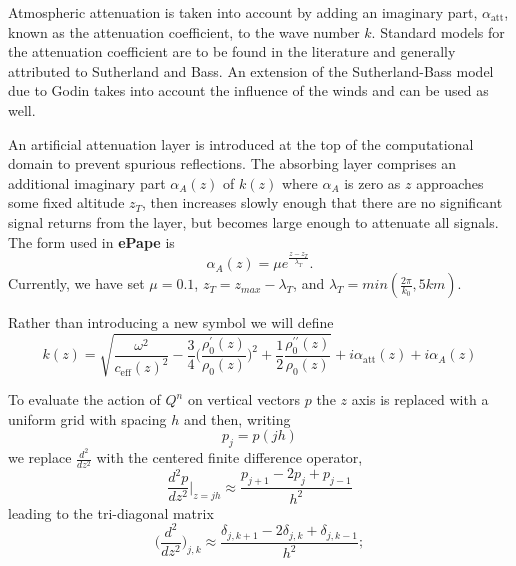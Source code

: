Atmospheric attenuation is taken into account by adding an imaginary part, $\alpha_{\text{att}}$, known as the attenuation coefficient, to the wave number $k$. Standard models for the attenuation coefficient are to be found in the literature and generally attributed to Sutherland and Bass\cite{bass_suth}. An extension of the Sutherland-Bass model due to Godin takes into account the influence of the winds and can be used as well\cite{Godin_attenuation}. 

An artificial attenuation layer is introduced at the top of the computational domain to prevent spurious reflections. The absorbing layer comprises an additional imaginary part $\alpha_A(z)$ of $k(z)$ where $\alpha_A$ is zero as $z$ approaches some fixed altitude $z_T$, then increases slowly enough that there are no significant signal returns from the layer, but becomes large enough to attenuate all signals. The form used in {\bf ePape} is
\begin{equation}
\alpha_A(z)=\mu e^{\frac{z-z_T}{\lambda_T}}.
\label{eq:artificial_attenuation}\end{equation}
Currently, we have set $\mu=0.1$, $z_T = z_{max}-\lambda_T$, and $\lambda_T=min(\frac{2\pi}{k_0},5 km)$.

Rather than introducing a new symbol we will define
\begin{equation}
k(z)
=
\sqrt{\frac{\omega^2}{c_{\text{eff}}(z)^2}-\frac{3}{4}\big(\frac{\rho_0^\prime(z)}{\rho_0(z)}\big)^2
+
\frac{1}{2}\frac{\rho_0^{\prime\prime}(z)}{\rho_0(z)}}
+i\alpha_{\text{att}}(z)+i\alpha_A(z)
\label{eq:complex_k}
\end{equation}

To evaluate the action of $Q^n$ on vertical vectors $p$ the $z$ axis is replaced with a uniform grid with spacing $h$ and then, writing
\[
p_j=p(jh)
\] 
we replace $\frac{d^2}{dz^2}$ with the centered finite difference operator, 
\[
\frac{d^2p}{dz^2}\big|_{z=jh}\approx \frac{p_{j+1}-2p_j+p_{j-1}}{h^2}
\]
leading to the tri-diagonal matrix
\[
\Big(\frac{d^2}{dz^2}\Big)_{j,k}\approx \frac{\delta_{j,k+1}-2\delta_{j,k}+\delta_{j,k-1}}{h^2};
\]

